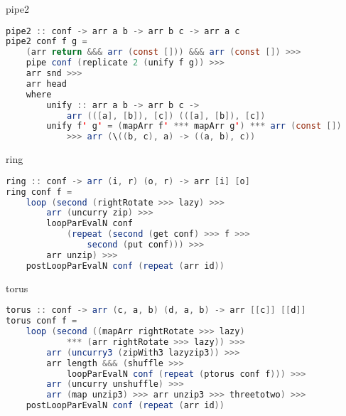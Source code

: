 \begin{frame}[fragile]{pipe2}
\begin{lstlisting}[frame=htrbl, language=java]
pipe2 :: conf -> arr a b -> arr b c -> arr a c
pipe2 conf f g =
    (arr return &&& arr (const [])) &&& arr (const []) >>>
    pipe conf (replicate 2 (unify f g)) >>>
    arr snd >>>
    arr head
    where
        unify :: arr a b -> arr b c -> 
            arr (([a], [b]), [c]) (([a], [b]), [c])
        unify f' g' = (mapArr f' *** mapArr g') *** arr (const [])
            >>> arr (\((b, c), a) -> ((a, b), c))
\end{lstlisting}
\end{frame}

\begin{frame}[fragile]{ring}
\begin{lstlisting}[frame=htrbl, language=java]
ring :: conf -> arr (i, r) (o, r) -> arr [i] [o]
ring conf f =
    loop (second (rightRotate >>> lazy) >>>
        arr (uncurry zip) >>>
        loopParEvalN conf
            (repeat (second (get conf) >>> f >>>
                second (put conf))) >>>
        arr unzip) >>>
    postLoopParEvalN conf (repeat (arr id))
\end{lstlisting}
\end{frame}

\begin{frame}[fragile]{torus}
\begin{lstlisting}[frame=htrbl, language=java]
torus :: conf -> arr (c, a, b) (d, a, b) -> arr [[c]] [[d]]
torus conf f =
    loop (second ((mapArr rightRotate >>> lazy)
            *** (arr rightRotate >>> lazy)) >>>
        arr (uncurry3 (zipWith3 lazyzip3)) >>>
        arr length &&& (shuffle >>>
            loopParEvalN conf (repeat (ptorus conf f))) >>>
        arr (uncurry unshuffle) >>>
        arr (map unzip3) >>> arr unzip3 >>> threetotwo) >>>
    postLoopParEvalN conf (repeat (arr id))
\end{lstlisting}
\end{frame}